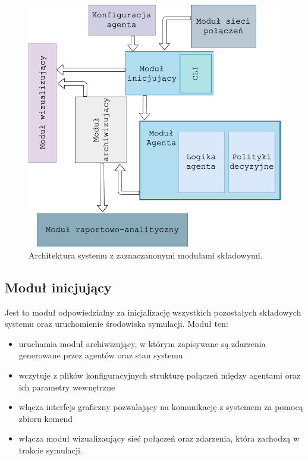 \documentclass{article}
\begin{document}
\begin{figure}[H]
	\centering
	\includegraphics[width=\textwidth, height=0.7\textheight]{./png/system-arch.png}
	\caption{Architektura systemu z zaznaczanonymi modułami składowymi.}
	\label{arch1}
\end{figure}

\subsection{Moduł inicjujący}

Jest to moduł odpowiedzialny za inicjalizację wszystkich pozostałych składowych systemu oraz 
uruchomienie środowiska symulacji. Moduł ten:

\begin{itemize}

\item uruchamia moduł archiwizujący, w którym zapisywane są zdarzenia generowane przez agentów oraz stan systemu 
\item wczytuje z plików konfiguracyjnych strukturę połączeń między agentami oraz ich parametry wewnętrzne 
\item włącza interfejs graficzny pozwalający na komunikację z systemem za pomocą zbioru komend  
\item włącza moduł wizualizaujący sieć połączeń oraz zdarzenia, która zachodzą w trakcie symulacji.

\end{itemize}
\end{document}
